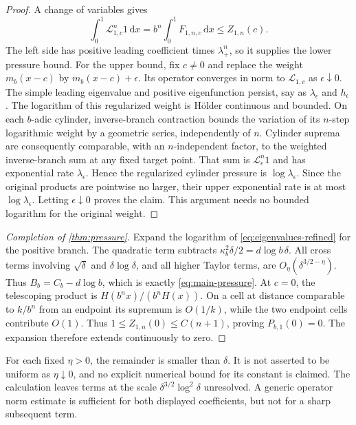 \documentclass[11pt,a4paper]{article}
\numberwithin{equation}{section}
\theoremstyle{definition}
\theoremstyle{remark}
\newcommand{\dd}{\,\mathrm d}
\newcommand{\Lop}{\mathcal L}
\begin{document}
\begin{proof}
A change of variables gives
\begin{equation}
 \int_0^1\Lop_{1,c}^n1\dd x=b^n\int_0^1 F_{1,n,c}\dd x
          \le Z_{1,n}(c).
 \label{eq:pressure-lower}
\end{equation}
The left side has positive leading coefficient times $\lambda_+^n$, so
it supplies the lower pressure bound.
For the upper bound, fix $c\ne0$ and replace the weight $m_b(x-c)$ by
$m_b(x-c)+\epsilon$. Its operator converges in norm to $\Lop_{1,c}$
as $\epsilon\downarrow0$. The simple leading eigenvalue and positive
eigenfunction persist, say as $\lambda_\epsilon$ and $h_\epsilon$.
The logarithm of this regularized weight is H\"older continuous and
bounded. On each $b$-adic cylinder, inverse-branch contraction bounds
the variation of its $n$-step logarithmic weight by a geometric series,
independently of $n$. Cylinder suprema are consequently comparable,
with an $n$-independent factor, to the weighted inverse-branch sum at any
fixed target point. That sum is $\Lop_\epsilon^n1$ and has exponential
rate $\lambda_\epsilon$. Hence the regularized cylinder pressure is
$\log\lambda_\epsilon$. Since the original products are pointwise no
larger, their upper exponential rate is at most
$\log\lambda_\epsilon$. Letting $\epsilon\downarrow0$ proves the claim.
This argument needs no bounded logarithm for the original weight.
\end{proof}

\begin{proof}[Completion of \cref{thm:pressure}]
Expand the logarithm of \cref{eq:eigenvalues-refined} for the positive
branch. The quadratic term subtracts $\kappa_b^2\delta/2=d\log b\,\delta$.
All cross terms involving $\sqrt\delta$ and $\delta\log\delta$, and all
higher Taylor terms, are $O_\eta(\delta^{3/2-\eta})$.
Thus $B_b=C_b-d\log b$, which is exactly \cref{eq:main-pressure}.
At $c=0$, the telescoping product is $H(b^nx)/(b^nH(x))$. On a cell
at distance comparable to $k/b^n$ from an endpoint its supremum is
$O(1/k)$, while the two endpoint cells contribute $O(1)$. Thus
$1\le Z_{1,n}(0)\le C(n+1)$, proving $P_{b,1}(0)=0$. The expansion
therefore extends continuously to zero.
\end{proof}

\begin{remark}
For each fixed $\eta>0$, the remainder is smaller than $\delta$.
It is not asserted to be uniform as $\eta\downarrow0$, and no explicit
numerical bound for its constant is claimed. The calculation leaves
terms at the scale $\delta^{3/2}\log^2\delta$ unresolved. A generic
operator norm estimate is sufficient for both displayed coefficients,
but not for a sharp subsequent term.
\end{remark}
\end{document}
